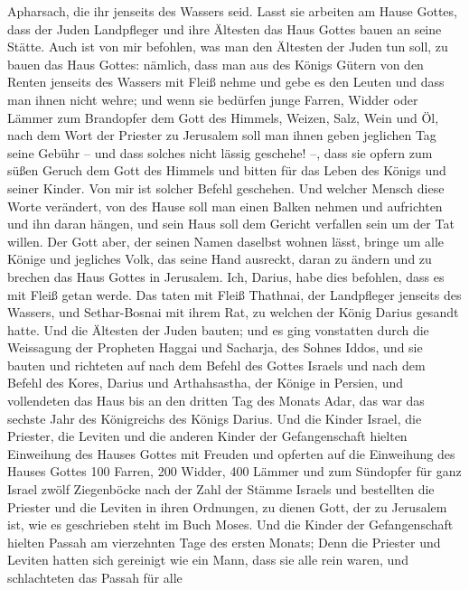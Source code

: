 Apharsach, die ihr jenseits des Wassers seid.  Lasst sie
arbeiten am Hause Gottes, dass der Juden Landpfleger und ihre Ältesten
das Haus Gottes bauen an seine Stätte.  Auch ist von mir
befohlen, was man den Ältesten der Juden tun soll, zu bauen das Haus
Gottes: nämlich, dass man aus des Königs Gütern von den Renten jenseits
des Wassers mit Fleiß nehme und gebe es den Leuten und dass man ihnen
nicht wehre;  und wenn sie bedürfen junge Farren, Widder
oder Lämmer zum Brandopfer dem Gott des Himmels, Weizen, Salz, Wein und
Öl, nach dem Wort der Priester zu Jerusalem soll man ihnen geben
jeglichen Tag seine Gebühr -- und dass solches nicht lässig geschehe!
--,  dass sie opfern zum süßen Geruch dem Gott des Himmels
und bitten für das Leben des Königs und seiner Kinder.  Von
mir ist solcher Befehl geschehen. Und welcher Mensch diese Worte
verändert, von des Hause soll man einen Balken nehmen und aufrichten und
ihn daran hängen, und sein Haus soll dem Gericht verfallen sein um der
Tat willen.  Der Gott aber, der seinen Namen daselbst
wohnen lässt, bringe um alle Könige und jegliches Volk, das seine Hand
ausreckt, daran zu ändern und zu brechen das Haus Gottes in Jerusalem.
Ich, Darius, habe dies befohlen, dass es mit Fleiß getan werde.
 Das taten mit Fleiß Thathnai, der Landpfleger jenseits des
Wassers, und Sethar-Bosnai mit ihrem Rat, zu welchen der König Darius
gesandt hatte.  Und die Ältesten der Juden bauten; und es
ging vonstatten durch die Weissagung der Propheten Haggai und Sacharja,
des Sohnes Iddos, und sie bauten und richteten auf nach dem Befehl des
Gottes Israels und nach dem Befehl des Kores, Darius und Arthahsastha,
der Könige in Persien,  und vollendeten das Haus bis an den
dritten Tag des Monats Adar, das war das sechste Jahr des Königreichs
des Königs Darius.  Und die Kinder Israel, die Priester,
die Leviten und die anderen Kinder der Gefangenschaft hielten Einweihung
des Hauses Gottes mit Freuden  und opferten auf die
Einweihung des Hauses Gottes 100 Farren, 200 Widder, 400 Lämmer und zum
Sündopfer für ganz Israel zwölf Ziegenböcke nach der Zahl der Stämme
Israels  und bestellten die Priester und die Leviten in
ihren Ordnungen, zu dienen Gott, der zu Jerusalem ist, wie es
geschrieben steht im Buch Moses.  Und die Kinder der
Gefangenschaft hielten Passah am vierzehnten Tage des ersten Monats;
 Denn die Priester und Leviten hatten sich gereinigt wie
ein Mann, dass sie alle rein waren, und schlachteten das Passah für alle
